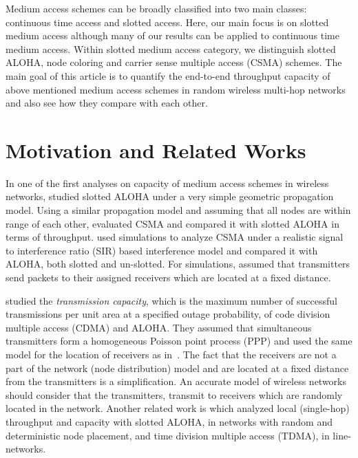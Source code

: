 \documentclass[12pt,english]{article}
\begin{document}
Medium access schemes can be broadly classified into two main classes: continuous time access and slotted access. Here, our main focus is on slotted medium access although many of our results can be applied to continuous time medium access. Within slotted medium access category, we distinguish slotted ALOHA, node coloring and carrier sense multiple access (CSMA) schemes. The main goal of this article is to quantify the end-to-end throughput capacity of above mentioned medium access schemes in random wireless multi-hop networks and also see how they compare with each other.

\section{Motivation and Related Works}
\label{sec:context}

In one of the first analyses on capacity of medium access schemes in wireless networks, \cite{Nelson:Kleinrock} studied slotted ALOHA under a very simple geometric propagation model. Using a similar propagation model and assuming that all nodes are within range of each other, \cite{CSMA} evaluated CSMA and compared it with slotted ALOHA in terms of throughput. \cite{Bartek} used simulations to analyze CSMA under a realistic signal to interference ratio (SIR) based interference model and compared it with ALOHA, both slotted and un-slotted. For simulations, \cite{Bartek} assumed that transmitters send packets to their assigned receivers which are located at a fixed distance. 

\cite{Weber,Weber2,Weber3} studied the {\em transmission capacity}, which is the maximum number of successful transmissions per unit area at a specified outage probability, of code division multiple access (CDMA) and ALOHA. They assumed that simultaneous transmitters form a homogeneous Poisson point process (PPP) and used the same model for the location of receivers as in~\cite{Bartek}. The fact that the receivers are not a part of the network (node distribution) model and are located at a fixed distance from the transmitters is a simplification. An accurate model of wireless networks should consider that the transmitters, transmit to receivers which are randomly located in the network. Another related work is \cite{Haenggi} which analyzed local (single-hop) throughput and capacity with slotted ALOHA, in networks with random and deterministic node placement, and time division multiple access (TDMA), in  line-networks. 
\end{document}
